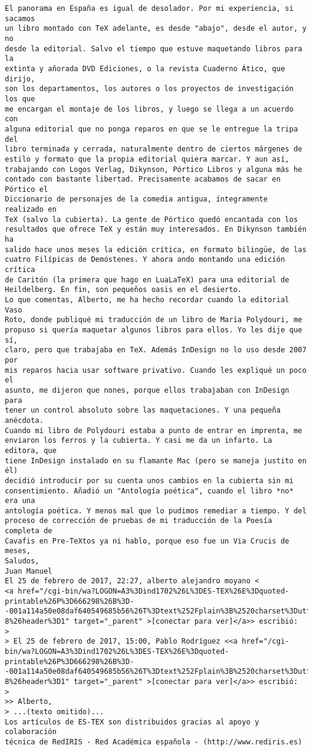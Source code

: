 \documentclass[a4paper,10pt]{article}
\begin{document}
\begin{lstlisting}
El panorama en España es igual de desolador. Por mi experiencia, si sacamos
un libro montado con TeX adelante, es desde "abajo", desde el autor, y no
desde la editorial. Salvo el tiempo que estuve maquetando libros para la
extinta y añorada DVD Ediciones, o la revista Cuaderno Ático, que dirijo,
son los departamentos, los autores o los proyectos de investigación los que
me encargan el montaje de los libros, y luego se llega a un acuerdo con
alguna editorial que no ponga reparos en que se le entregue la tripa del
libro terminada y cerrada, naturalmente dentro de ciertos márgenes de
estilo y formato que la propia editorial quiera marcar. Y aun así,
trabajando con Logos Verlag, Dikynson, Pórtico Libros y alguna más he
contado con bastante libertad. Precisamente acabamos de sacar en Pórtico el
Diccionario de personajes de la comedia antigua, íntegramente realizado en
TeX (salvo la cubierta). La gente de Pórtico quedó encantada con los
resultados que ofrece TeX y están muy interesados. En Dikynson también ha
salido hace unos meses la edición crítica, en formato bilingüe, de las
cuatro Filípicas de Demóstenes. Y ahora ando montando una edición crítica
de Caritón (la primera que hago en LuaLaTeX) para una editorial de
Heildelberg. En fin, son pequeños oasis en el desierto.
Lo que comentas, Alberto, me ha hecho recordar cuando la editorial Vaso
Roto, donde publiqué mi traducción de un libro de María Polydouri, me
propuso si quería maquetar algunos libros para ellos. Yo les dije que sí,
claro, pero que trabajaba en TeX. Además InDesign no lo uso desde 2007 por
mis reparos hacia usar software privativo. Cuando les expliqué un poco el
asunto, me dijeron que nones, porque ellos trabajaban con InDesign para
tener un control absoluto sobre las maquetaciones. Y una pequeña anécdota.
Cuando mi libro de Polydouri estaba a punto de entrar en imprenta, me
enviaron los ferros y la cubierta. Y casi me da un infarto. La editora, que
tiene InDesign instalado en su flamante Mac (pero se maneja justito en él)
decidió introducir por su cuenta unos cambios en la cubierta sin mi
consentimiento. Añadió un "Antología poética", cuando el libro *no* era una
antología poética. Y menos mal que lo pudimos remediar a tiempo. Y del
proceso de corrección de pruebas de mi traducción de la Poesía completa de
Cavafis en Pre-TeXtos ya ni hablo, porque eso fue un Via Crucis de meses,
Saludos,
Juan Manuel
El 25 de febrero de 2017, 22:27, alberto alejandro moyano <
<a href="/cgi-bin/wa?LOGON=A3%3Dind1702%26L%3DES-TEX%26E%3Dquoted-printable%26P%3D666298%26B%3D--001a114a50e08daf640549685b56%26T%3Dtext%252Fplain%3B%2520charset%3Dutf-8%26header%3D1" target="_parent" >[conectar para ver]</a>> escribió:
>
> El 25 de febrero de 2017, 15:00, Pablo Rodríguez <<a href="/cgi-bin/wa?LOGON=A3%3Dind1702%26L%3DES-TEX%26E%3Dquoted-printable%26P%3D666298%26B%3D--001a114a50e08daf640549685b56%26T%3Dtext%252Fplain%3B%2520charset%3Dutf-8%26header%3D1" target="_parent" >[conectar para ver]</a>> escribió:
>
>> Alberto,
> ...(texto omitido)...
Los artículos de ES-TEX son distribuidos gracias al apoyo y colaboración 
técnica de RedIRIS - Red Académica española - (http://www.rediris.es)

\end{lstlisting}
\end{document}
